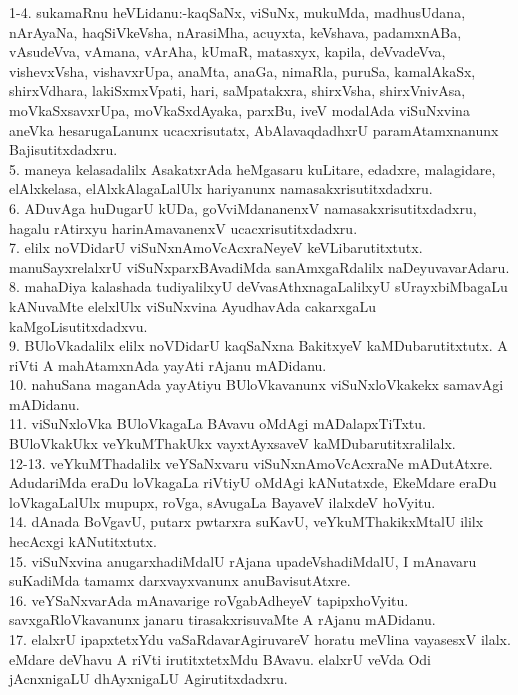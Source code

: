 \documentclass{article}
\begin{document}
1-4. sukamaRnu heVLidanu:-kaqSaNx, viSuNx, mukuMda, madhusUdana, nArAyaNa, haqSiVkeVsha, nArasiMha, acuyxta, keVshava, padamxnABa, vAsudeVva, vAmana, vArAha, kUmaR, matasxyx, kapila, deVvadeVva, vishevxVsha, vishavxrUpa, anaMta, anaGa, nimaRla, puruSa, kamalAkaSx, shirxVdhara, lakiSxmxVpati, hari, saMpatakxra, shirxVsha, shirxVnivAsa, moVkaSxsavxrUpa, moVkaSxdAyaka, parxBu, iveV modalAda viSuNxvina aneVka hesarugaLanunx ucacxrisutatx, AbAlavaqdadhxrU paramAtamxnanunx Bajisutitxdadxru.\\
5. maneya kelasadalilx AsakatxrAda heMgasaru kuLitare, edadxre, malagidare, elAlxkelasa, elAlxkAlagaLalUlx hariyanunx namasakxrisutitxdadxru.\\
6. ADuvAga huDugarU kUDa, goVviMdananenxV namasakxrisutitxdadxru, hagalu rAtirxyu harinAmavanenxV ucacxrisutitxdadxru.\\
7. elilx noVDidarU viSuNxnAmoVcAcxraNeyeV keVLibarutitxtutx. manuSayxrelalxrU viSuNxparxBAvadiMda sanAmxgaRdalilx naDeyuvavarAdaru.\\
8. mahaDiya kalashada tudiyalilxyU deVvasAthxnagaLalilxyU sUrayxbiMbagaLu kANuvaMte elelxlUlx viSuNxvina AyudhavAda cakarxgaLu kaMgoLisutitxdadxvu.\\
9. BUloVkadalilx elilx noVDidarU kaqSaNxna BakitxyeV kaMDubarutitxtutx. A riVti A mahAtamxnAda yayAti rAjanu mADidanu.\\
10. nahuSana maganAda yayAtiyu BUloVkavanunx viSuNxloVkakekx samavAgi mADidanu.\\
11. viSuNxloVka BUloVkagaLa BAvavu oMdAgi mADalapxTiTxtu. BUloVkakUkx veYkuMThakUkx vayxtAyxsaveV kaMDubarutitxralilalx.\\
12-13. veYkuMThadalilx veYSaNxvaru viSuNxnAmoVcAcxraNe mADutAtxre. AdudariMda eraDu loVkagaLa riVtiyU oMdAgi kANutatxde, EkeMdare eraDu loVkagaLalUlx mupupx, roVga, sAvugaLa BayaveV ilalxdeV hoVyitu.\\
14. dAnada BoVgavU, putarx pwtarxra suKavU, veYkuMThakikxMtalU ililx hecAcxgi kANutitxtutx.\\
15. viSuNxvina anugarxhadiMdalU rAjana upadeVshadiMdalU, I mAnavaru suKadiMda tamamx darxvayxvanunx anuBavisutAtxre.\\
16. veYSaNxvarAda mAnavarige roVgabAdheyeV tapipxhoVyitu. savxgaRloVkavanunx janaru tirasakxrisuvaMte A rAjanu mADidanu.\\
17. elalxrU ipapxtetxYdu vaSaRdavarAgiruvareV horatu meVlina vayasesxV ilalx. eMdare deVhavu A riVti irutitxtetxMdu BAvavu. elalxrU veVda Odi jAcnxnigaLU dhAyxnigaLU Agirutitxdadxru.\\
\end{document}
